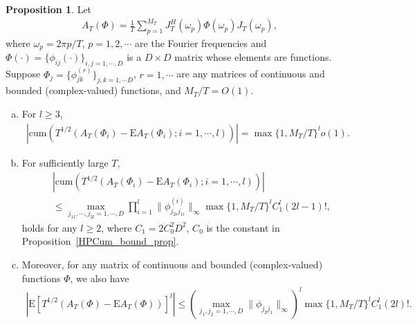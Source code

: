 \documentclass[11pt]{article}
\numberwithin{equation}{section}
\theoremstyle{plain}
\theoremstyle{definition}
\theoremstyle{definition}
\theoremstyle{assumption}
\theoremstyle{proposition}
\newtheorem{proposition}{Proposition}[section]
\theoremstyle{proposition}
\theoremstyle{example}
\theoremstyle{lemma}
\theoremstyle{theorem}
\theoremstyle{remark}
\begin{document}
\begin{proposition}\label{higher_order_Expectation_prop}
Let
\begin{align*}
A_T(\Phi) = \frac{1}{T}\sum_{p=1}^{M_T} J_T^{H}(\omega_p)\Phi(\omega_p) J_T(\omega_p),
\end{align*}
where $\omega_p = 2\pi p/T$, $p=1,2,\cdots$ are the Fourier frequencies and $\Phi(\cdot) = \{\phi_{ij}(\cdot)\}_{i,j=1,\cdots,D}$ is a $D\times D$ matrix whose elements are functions. Suppose $\Phi_j =\{\phi_{jk}^{(r)}\}_{j,k=1,\cdots D}$, $r=1,\cdots$ are any matrices of continuous and bounded  (complex-valued) functions, and $M_T/T = O(1)$.
\begin{enumerate}[(a)]
\item For $l\geqslant3$,
\begin{align*}
\left|\mathrm{cum}\left(T^{1/2}(A_T(\Phi_i) - \mathrm{E}A_T(\Phi_i);i=1,\cdots,l)\right)\right|
= \max\{1, M_T/T\}^{l} o(1).
\end{align*}

\item For sufficiently large $T$,
\begin{align*}
&\left|\mathrm{cum}\left(T^{1/2}(A_T(\Phi_i) - \mathrm{E}A_T(\Phi_i);i=1,\cdots,l)\right)\right| \\
&\leqslant  \max_{j_{11},\cdots,j_{2l} = 1,\cdots,D}\prod_{i=1}^l\|\phi_{j_{2i} j_{1i}}^{(i)}\|_{\infty}\max\{1, M_T/T\}^{l} C_1^l (2l-1)! ,
\end{align*}
holds for any $l\geqslant2$, where $C_1=2C_0^2 D^2$, $C_0$ is the constant in Proposition~\ref{HPCum_bound_prop}.

\item Moreover, for any matrix of continuous and bounded (complex-valued) functions $\Phi$, we also have
\begin{align*}
\left|\mathrm{E}\left[T^{1/2}(A_T(\Phi) - \mathrm{E}A_T(\Phi))\right]^l\right|
\leqslant \left(\max_{j_{1},j_{2} = 1,\cdots,D}\|\phi_{j_{2} j_{1}}\|_{\infty}\right)^l\max\{1, M_T/T\}^{l} C_1^l (2l)! .
\end{align*}
\end{enumerate}


\end{proposition}
\end{document}
